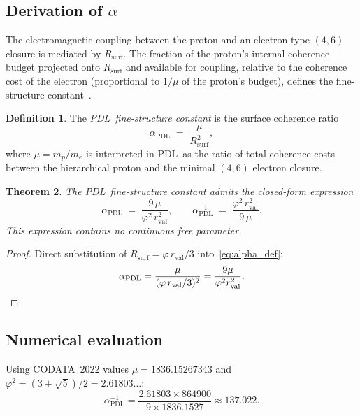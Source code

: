 \documentclass[11pt,a4paper]{article}
\newtheorem{theorem}{Theorem}[section]
\theoremstyle{definition}
\newtheorem{definition}[theorem]{Definition}
\newcommand{\PDL}{\textnormal{PDL}}
\newcommand{\Rsurf}{R_{\mathrm{surf}}}
\newcommand{\rval}{r_{\mathrm{val}}}
\newcommand{\alphaPDL}{\alpha_{\mathrm{PDL}}}
\newcommand{\vp}{\varphi}
\begin{document}
\subsection{Derivation of \texorpdfstring{$\alpha$}{alpha}}
\label{subsec:alpha_formula}

The electromagnetic coupling between the proton and an electron-type $(4,6)$ closure is mediated by $\Rsurf$. The fraction of the proton's internal coherence budget projected onto $\Rsurf$ and available for coupling, relative to the coherence cost of the electron (proportional to $1/\mu$ of the proton's budget), defines the fine-structure constant~\cite{Alpha_PDL_v2_2026}.

\begin{definition}
  \label{def:alpha_PDL}
  The \emph{\PDL\ fine-structure constant} is the surface coherence ratio
  \begin{equation}
    \label{eq:alpha_def}
    \alphaPDL \;=\; \frac{\mu}{\Rsurf^2},
  \end{equation}
  where $\mu = m_p/m_e$ is interpreted in \PDL\ as the ratio of total
  coherence costs between the hierarchical proton and the minimal $(4,6)$
  electron closure.
\end{definition}

\begin{theorem}
  \label{thm:alpha_PDL}
  The \PDL\ fine-structure constant admits the closed-form expression
  \begin{equation}
    \label{eq:alpha_PDL}
    \alphaPDL \;=\; \frac{9\,\mu}{\vp^2\,\rval^2},
    \qquad
    \alphaPDL^{-1} \;=\; \frac{\vp^2\,\rval^2}{9\,\mu}.
  \end{equation}
  This expression contains no continuous free parameter.
\end{theorem}

\begin{proof}
  Direct substitution of $\Rsurf = \vp\,\rval/3$ into~\eqref{eq:alpha_def}:
  \[
    \alphaPDL = \frac{\mu}{(\vp\,\rval/3)^2} = \frac{9\mu}{\vp^2\rval^2}. \qedhere
  \]
\end{proof}

\subsection{Numerical evaluation}
\label{subsec:alpha_numerical}

Using CODATA~2022 values $\mu = 1836.15267343$ and
$\vp^2 = (3+\sqrt{5})/2 = 2.61803\ldots$:
\[
  \alphaPDL^{-1} = \frac{2.61803 \times 864900}{9 \times 1836.1527}
                 \approx 137.022.
\]
\end{document}
